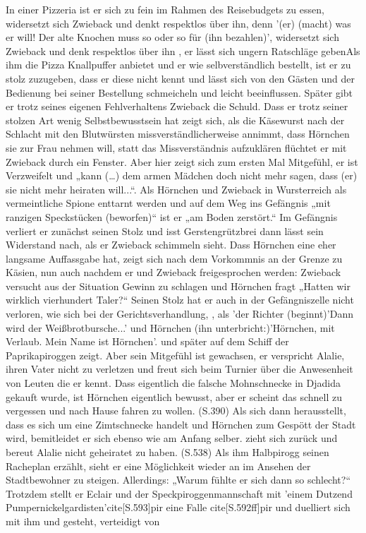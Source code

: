 {In einer Pizzeria ist er sich zu fein im Rahmen des Reisebudgets zu essen, widersetzt sich Zwieback und denkt respektlos über ihn\cite[S.170f]{pir}, denn '(er) (macht) was er will! Der alte Knochen muss so oder so für (ihn bezahlen)',\cite[S.170f]{pir} widersetzt sich Zwieback und denk respektlos über ihn \cite[S.170f]{pir}, er lässt sich ungern Ratschläge geben\cite[S.170f]{pir}\cite[S.219f]{pir}Als ihm die Pizza Knallpuffer anbietet und er wie selbverständlich bestellt, ist er zu stolz zuzugeben, dass er diese nicht kennt und lässt sich von den Gästen und der Bedienung bei seiner Bestellung schmeicheln und leicht beeinflussen.\cite[S.171]{pir} Später gibt er trotz seines eigenen Fehlverhaltens Zwieback die Schuld.\cite[S.219]{pir} Dass er trotz seiner stolzen Art wenig Selbstbewusstsein hat zeigt sich, als die Käsewurst nach der Schlacht mit den Blutwürsten missverständlicherweise annimmt, dass Hörnchen sie zur Frau nehmen will,\cite[S.230]{pir} statt das Missverständnis aufzuklären flüchtet er mit Zwieback durch ein Fenster.\cite[S.233ff]{pir} Aber hier zeigt sich zum ersten Mal Mitgefühl, er ist Verzweifelt und „kann (…) dem armen Mädchen doch nicht mehr sagen, dass (er) sie nicht mehr heiraten will...“.\cite[S.239]{pir} Als Hörnchen und Zwieback in Wursterreich als vermeintliche Spione enttarnt werden und auf dem Weg ins Gefängnis „mit ranzigen Speckstücken (beworfen)“\cite[S.294]{pir} ist er „am Boden zerstört.“\cite[S.294]{pir} Im Gefängnis verliert er zunächst seinen Stolz und isst Gerstengrützbrei  dann lässt sein Widerstand nach, als er Zwieback schimmeln sieht.\cite[S.322]{pir} Dass Hörnchen eine eher langsame Auffassgabe hat, zeigt sich nach dem Vorkommnis an der Grenze zu Käsien,\cite[S.142]{pir} nun auch nachdem er und Zwieback freigesprochen werden: Zwieback versucht aus der Situation Gewinn zu schlagen und Hörnchen fragt „Hatten wir wirklich vierhundert Taler?“ \cite[S.331]{pir}Seinen Stolz hat er auch in der Gefängniszelle nicht verloren, wie sich bei der Gerichtsverhandlung, \cite[S.336]{pir}, als 'der Richter (beginnt)'Dann wird der Weißbrotbursche...' und Hörnchen (ihn unterbricht:)'Hörnchen, mit Verlaub. Mein Name ist Hörnchen'.\cite[S.336f]{pir} und später auf dem Schiff der Paprikapiroggen zeigt.\cite[S.367f]{pir} Aber sein Mitgefühl ist gewachsen, er verspricht Alalie, ihren Vater nicht zu verletzen \cite[S.341]{pir} und freut sich beim Turnier über die Anwesenheit von Leuten die er kennt.\cite[S.349]{pir} Dass eigentlich die falsche Mohnschnecke in Djadida gekauft wurde, ist Hörnchen eigentlich bewusst, aber er scheint das schnell zu vergessen und nach Hause fahren zu wollen. (S.390) Als sich dann herausstellt, dass es sich um eine Zimtschnecke handelt und Hörnchen zum Gespött der Stadt wird, bemitleidet er sich ebenso wie am Anfang selber.\cite[S.514]{pir} zieht sich zurück und bereut Alalie nicht geheiratet zu haben. (S.538) Als ihm Halbpirogg seinen Racheplan erzählt, sieht er eine Möglichkeit wieder an im Ansehen der Stadtbewohner zu steigen. \cite[S.540]{pir} Allerdings: „Warum fühlte er sich dann so schlecht?“\cite[S.559]{pir} Trotzdem stellt er Eclair und der Speckpiroggenmannschaft mit 'einem Dutzend Pumpernickelgardisten'cite[S.593]{pir} eine Falle cite[S.592ff]{pir} und duelliert sich mit ihm \cite[S.596ff]{pir} und gesteht, verteidigt von }

